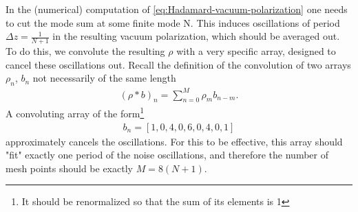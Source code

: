 In the (numerical) computation of \eqref{eq:Hadamard-vacuum-polarization} one needs to cut the mode sum at some finite mode N. This induces oscillations of period $\Delta z = \frac{1}{N + 1}$ in the resulting vacuum polarization, which should be averaged out. To do this, we convolute the resulting $\rho$ with a very specific array, designed to cancel these oscillations out. 
Recall the definition of the convolution of two arrays $\rho_n$, $b_n$ not necessarily of the same length
\begin{align}
	(\rho*b)_n = \sum_{n=0}^{M} \rho_m b_{n-m}.
\end{align}
A convoluting array of the form\footnote{It should be renormalized so that the sum of its elements is 1}
\begin{align}
	b_n = \left[ 1, 0 , 4 , 0 , 6 , 0,4,0,1 \right] 
\end{align}
approximately cancels the oscillations. For this to be effective, this array should "fit" exactly one period of the noise oscillations, and therefore the number of mesh points should be exactly $M = 8 (N + 1)$.

